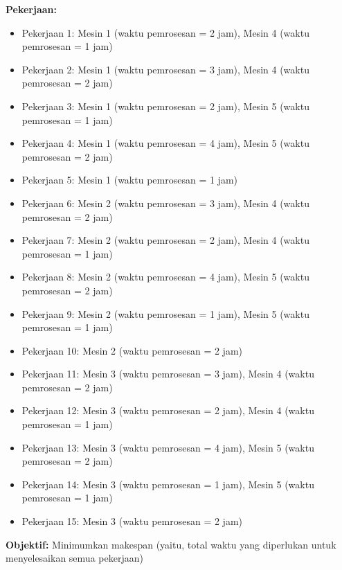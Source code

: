 \textbf{Pekerjaan:}
\begin{itemize}
    \item Pekerjaan 1: Mesin 1 (waktu pemrosesan = 2 jam), Mesin 4 (waktu pemrosesan = 1 jam)
    \item Pekerjaan 2: Mesin 1 (waktu pemrosesan = 3 jam), Mesin 4 (waktu pemrosesan = 2 jam)
    \item Pekerjaan 3: Mesin 1 (waktu pemrosesan = 2 jam), Mesin 5 (waktu pemrosesan = 1 jam)
    \item Pekerjaan 4: Mesin 1 (waktu pemrosesan = 4 jam), Mesin 5 (waktu pemrosesan = 2 jam)
    \item Pekerjaan 5: Mesin 1 (waktu pemrosesan = 1 jam)
    \item Pekerjaan 6: Mesin 2 (waktu pemrosesan = 3 jam), Mesin 4 (waktu pemrosesan = 2 jam)
    \item Pekerjaan 7: Mesin 2 (waktu pemrosesan = 2 jam), Mesin 4 (waktu pemrosesan = 1 jam)
    \item Pekerjaan 8: Mesin 2 (waktu pemrosesan = 4 jam), Mesin 5 (waktu pemrosesan = 2 jam)
    \item Pekerjaan 9: Mesin 2 (waktu pemrosesan = 1 jam), Mesin 5 (waktu pemrosesan = 1 jam)
    \item Pekerjaan 10: Mesin 2 (waktu pemrosesan = 2 jam)
    \item Pekerjaan 11: Mesin 3 (waktu pemrosesan = 3 jam), Mesin 4 (waktu pemrosesan = 2 jam)
    \item Pekerjaan 12: Mesin 3 (waktu pemrosesan = 2 jam), Mesin 4 (waktu pemrosesan = 1 jam)
    \item Pekerjaan 13: Mesin 3 (waktu pemrosesan = 4 jam), Mesin 5 (waktu pemrosesan = 2 jam)
    \item Pekerjaan 14: Mesin 3 (waktu pemrosesan = 1 jam), Mesin 5 (waktu pemrosesan = 1 jam)
    \item Pekerjaan 15: Mesin 3 (waktu pemrosesan = 2 jam)
\end{itemize}

\textbf{Objektif:} Minimumkan makespan (yaitu, total waktu yang diperlukan untuk menyelesaikan semua pekerjaan)

